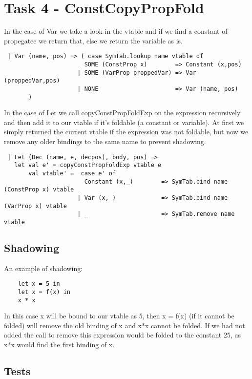 \documentclass{article}
\begin{document}
\newpage

\section{Task 4 - ConstCopyPropFold}
In the case of Var we take a look in the vtable and if we find a constant of propegatee we return that, else we return the variable as is.

\begin{lstlisting}
 | Var (name, pos) => ( case SymTab.lookup name vtable of
                       SOME (ConstProp x)        => Constant (x,pos) 
                     | SOME (VarProp proppedVar) => Var (proppedVar,pos)
                     | NONE                      => Var (name, pos)
       )
\end{lstlisting}

\noindent In the case of Let we call copyConstPropFoldExp on the expression recursively and then add it to our vtable if it's foldable (a constant or variable). At first we simply returned the current vtable if the expression was not foldable, but now we remove any older bindings to the same name to prevent shadowing.

\begin{lstlisting}
 | Let (Dec (name, e, decpos), body, pos) => 
   let val e' = copyConstPropFoldExp vtable e
       val vtable' =  case e' of
                       Constant (x,_)        => SymTab.bind name (ConstProp x) vtable 
                     | Var (x,_)             => SymTab.bind name (VarProp x) vtable
                     | _                     => SymTab.remove name vtable
\end{lstlisting}

\subsection{Shadowing}
\noindent An example of shadowing:

\begin{lstlisting}
    let x = 5 in
    let x = f(x) in
    x * x
\end{lstlisting}

\noindent In this case x will be bound to our vtable as 5, then x = f(x) (if it cannot be folded) will remove the old binding of x and x*x cannot be folded. If we had not added the call to remove this expression would be folded to the constant 25, as x*x would find the first binding of x.

\subsection{Tests}
\end{document}

